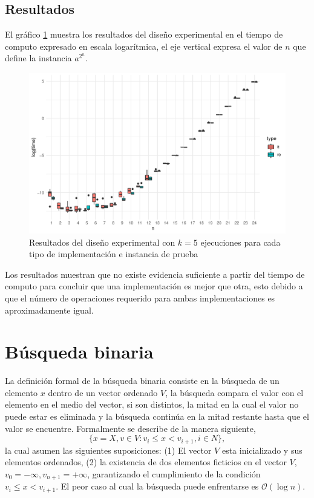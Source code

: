 \documentclass[letterpaper,11pt]{article}
\begin{document}
\subsection{Resultados}
El gráfico \ref{fig:ie} muestra los resultados del diseño experimental en el tiempo de computo expresado en escala logarítmica, el eje vertical expresa el valor de $n$ que define la instancia $a^{2^n}$.

\begin{figure}[h!]
  \includegraphics[width=\linewidth]{ie.pdf}
  \caption{Resultados del diseño experimental con $k=5$ ejecuciones para cada tipo de implementación e instancia de prueba}
  \label{fig:ie}
\end{figure}

Los resultados muestran que no existe evidencia suficiente a partir del tiempo de computo para concluir que una implementación es mejor que otra, esto debido a que el número de operaciones requerido para ambas implementaciones es aproximadamente igual.

\section{Búsqueda binaria}

La definición formal de la búsqueda binaria consiste en la búsqueda de un elemento $x$ dentro de un vector ordenado $V$,  la búsqueda compara el valor con el elemento en el medio del vector, si son distintos, la mitad en la cual el valor no puede estar es eliminada y la búsqueda continúa en la mitad restante hasta que el valor se encuentre. Formalmente se describe de la manera siguiente,
\begin{equation}
\{ x= X, v \in V: v_i \leq x < v_{i+1}, i\in N \}, 
\end{equation}
la cual asumen las siguientes suposiciones: (1) El vector $V$ esta inicializado y sus elementos ordenados, (2) la existencia de dos elementos ficticios en el vector $V$, $v_0=-\infty, v_{n+1}=+\infty$, garantizando el cumplimiento de la condición $v_i \leq x < v_{i+1}$. El peor caso al cual la búsqueda puede enfrentarse es $\mathcal{O}(\log{}n).$
\end{document}
